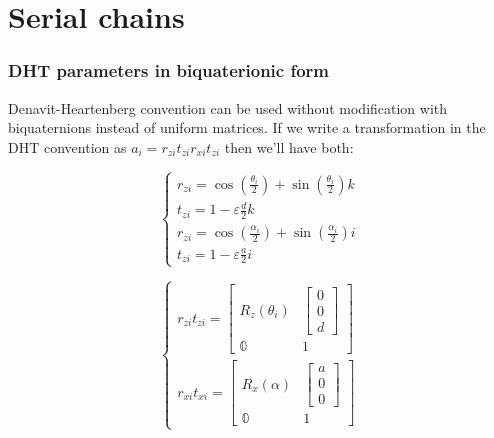 \chapter{Serial chains}
\subsection{DHT parameters in biquaterionic form}
Denavit-Heartenberg convention can be used without modification with biquaternions instead of uniform matrices. If we write a transformation in the DHT convention as $a_i = r_{zi}t_{zi}r_{xi}t_{zi}$ then we'll have both:\\

\noindent  \begin{minipage}{0.5\linewidth}
\begin{equation}
    \begin{cases}
        r_{zi} = \cos{(\frac{\theta_i}{2})} + \sin{(\frac{\theta_i}{2})}k\\
        t_{zi} = 1 - \varepsilon \frac{d}{2} k\\
        r_{zi} = \cos{(\frac{\alpha_i}{2})} + \sin{(\frac{\alpha_i}{2})}i\\
        t_{zi} = 1 - \varepsilon\frac{a}{2} i 
    \end{cases}
\end{equation}    
\end{minipage}
\begin{minipage}{0.5\linewidth}

\begin{equation}
    \begin{cases}
        r_{zi}t_{zi} = \begin{bmatrix}
            R_z(\theta_i) &  \begin{bmatrix}
                0   \\ 0 \\ d
            \end{bmatrix} \\
                \mathbb{0} & 1
        \end{bmatrix}\\
        r_{xi}t_{xi} = \begin{bmatrix}
            R_x(\alpha) &  \begin{bmatrix}
                a   \\ 0 \\ 0
            \end{bmatrix} \\
                \mathbb{0} & 1
        \end{bmatrix}
    \end{cases}
\end{equation}    
\end{minipage}

